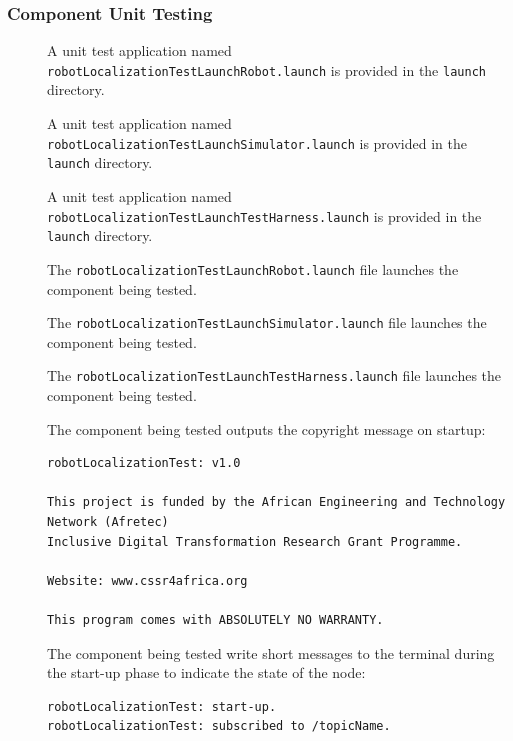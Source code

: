 \documentclass{CSSRforAfrica}
\newcommand{\checkboxChecked}{\fbox{\ding{51}}} %
\newcommand{\checkboxDashed}{\fbox{--}}         %
\begin{document}
\subsubsection{Component Unit Testing}

\begin{description}

\item[\checkboxChecked] A unit test application named {\small \verb+robotLocalizationTestLaunchRobot.launch+} is provided in the {\small \verb+launch+} directory. 

\item[\checkboxDashed] A unit test application named {\small \verb+robotLocalizationTestLaunchSimulator.launch+} is provided in the {\small \verb+launch+} directory.

\item[\checkboxChecked] A unit test application named {\small \verb+robotLocalizationTestLaunchTestHarness.launch+} is provided in the {\small \verb+launch+} directory.

\item[\checkboxChecked] The {\small \verb+robotLocalizationTestLaunchRobot.launch+} file  launches the component being tested.

\item[\checkboxDashed] The {\small \verb+robotLocalizationTestLaunchSimulator.launch+} file  launches the component being tested.

\item[\checkboxChecked] The {\small \verb+robotLocalizationTestLaunchTestHarness.launch+} file  launches the component being tested.

\item[\checkboxChecked] The component being tested outputs the copyright message on startup:  \\ 
{\scriptsize
\begin{verbatim}
robotLocalizationTest: v1.0

This project is funded by the African Engineering and Technology Network (Afretec) 
Inclusive Digital Transformation Research Grant Programme. 

Website: www.cssr4africa.org

This program comes with ABSOLUTELY NO WARRANTY.
\end{verbatim}
}

\item[\checkboxChecked] The component being tested write short messages to the terminal  during the start-up phase to indicate the state of the node:
{\small
\begin{verbatim}
robotLocalizationTest: start-up.
robotLocalizationTest: subscribed to /topicName.
\end{verbatim}
} 


\end{description}
\end{document}
